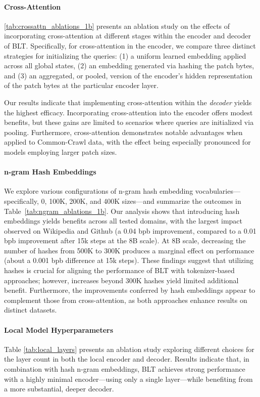 \paragraph{Cross-Attention} 
\autoref{tab:crossattn_ablations_1b} presents an ablation study on the effects of incorporating cross-attention at different stages within the encoder and decoder of {\textsc BLT}. Specifically, for cross-attention in the encoder, we compare three distinct strategies for initializing the queries: (1) a uniform learned embedding applied across all global states, (2) an embedding generated via hashing the patch bytes, and (3) an aggregated, or pooled, version of the encoder's hidden representation of the patch bytes at the particular encoder layer.

Our results indicate that implementing cross-attention within the \textit{decoder} yields the highest efficacy. Incorporating cross-attention into the encoder offers modest benefits, but these gains are limited to scenarios where queries are initialized via pooling. Furthermore, cross-attention demonstrates notable advantages when applied to Common-Crawl data, with the effect being especially pronounced for models employing larger patch sizes.

\paragraph{n-gram Hash Embeddings} 

We explore various configurations of n-gram hash embedding vocabularies—specifically, 0, 100K, 200K, and 400K sizes—and summarize the outcomes in Table~\ref{tab:ngram_ablations_1b}. Our analysis shows that introducing hash embeddings yields benefits across all tested domains, with the largest impact observed on Wikipedia and Github (a 0.04 bpb improvement, compared to a 0.01 bpb improvement after 15k steps at the 8B scale). At 8B scale, decreasing the number of hashes from 500K to 300K produces a marginal effect on performance (about a 0.001 bpb difference at 15k steps). These findings suggest that utilizing hashes is crucial for aligning the performance of {\textsc BLT} with tokenizer-based approaches; however, increases beyond 300K hashes yield limited additional benefit. Furthermore, the improvements conferred by hash embeddings appear to complement those from cross-attention, as both approaches enhance results on distinct datasets.

\paragraph{Local Model Hyperparameters} Table \ref{tab:local_layers} presents an ablation study exploring different choices for the layer count in both the local encoder and decoder. Results indicate that, in combination with hash n-gram embeddings, {\textsc BLT} achieves strong performance with a highly minimal encoder—using only a single layer—while benefiting from a more substantial, deeper decoder.

